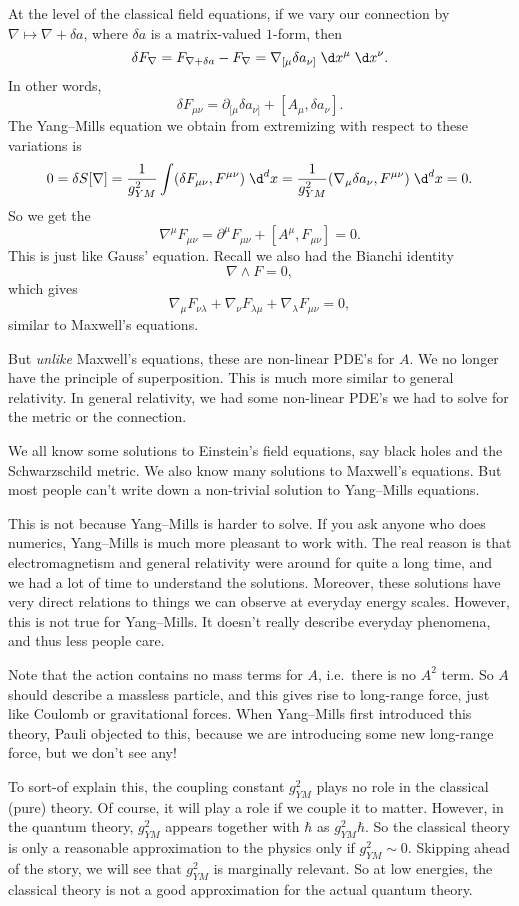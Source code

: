 \documentclass[a4paper]{article}
\begin{document}
At the level of the classical field equations, if we vary our connection by $\nabla \mapsto \nabla + \delta a$, where $\delta a$ is a matrix-valued $1$-form, then
\[
  \delta F_\nabla = F_{\nabla + \delta a} - F_{\nabla} = \nabla_{[\mu} \delta a_{\nu]}\;\d x^\mu\; \d x^\nu.
\]
In other words,
\[
  \delta F_{\mu\nu} = \partial_{[\mu} \delta a_{\nu]} + [A_\mu, \delta a_\nu].
\]
The Yang--Mills equation we obtain from extremizing with respect to these variations is
\[
  0 = \delta S[\nabla] = \frac{1}{g_{YM}^2} \int (\delta F_{\mu\nu}, F^{\mu\nu}) \;\d^d x = \frac{1}{g_{YM}^2} (\nabla_\mu \delta a_\nu, F^{\mu\nu})\;\d^d x = 0.
\]
So we get the 
\[
  \nabla^\mu F_{\mu\nu} = \partial^\mu F_{\mu\nu} + [A^\mu, F_{\mu\nu}] = 0.
\]
This is just like Gauss' equation. Recall we also had the Bianchi identity
\[
  \nabla \wedge F = 0,
\]
which gives
\[
  \nabla_\mu F_{\nu\lambda} + \nabla_\nu F_{\lambda\mu} + \nabla_\lambda F_{\mu\nu} = 0,
\]
similar to Maxwell's equations.

But \emph{unlike} Maxwell's equations, these are non-linear PDE's for $A$. We no longer have the principle of superposition. This is much more similar to general relativity. In general relativity, we had some non-linear PDE's we had to solve for the metric or the connection.

We all know some solutions to Einstein's field equations, say black holes and the Schwarzschild metric. We also know many solutions to Maxwell's equations. But most people can't write down a non-trivial solution to Yang--Mills equations.

This is not because Yang--Mills is harder to solve. If you ask anyone who does numerics, Yang--Mills is much more pleasant to work with. The real reason is that electromagnetism and general relativity were around for quite a long time, and we had a lot of time to understand the solutions. Moreover, these solutions have very direct relations to things we can observe at everyday energy scales. However, this is not true for Yang--Mills. It doesn't really describe everyday phenomena, and thus less people care.

Note that the action contains no mass terms for $A$, i.e.\ there is no $A^2$ term. So $A$ should describe a massless particle, and this gives rise to long-range force, just like Coulomb or gravitational forces. When Yang--Mills first introduced this theory, Pauli objected to this, because we are introducing some new long-range force, but we don't see any!

To sort-of explain this, the coupling constant $g^2_{YM}$ plays no role in the classical (pure) theory. Of course, it will play a role if we couple it to matter. However, in the quantum theory, $g^2_{YM}$ appears together with $\hbar$ as $g^2_{YM} \hbar$. So the classical theory is only a reasonable approximation to the physics only if $g^2_{YM} \sim 0$. Skipping ahead of the story, we will see that $g^2_{YM}$ is marginally relevant. So at low energies, the classical theory is not a good approximation for the actual quantum theory.
\end{document}
